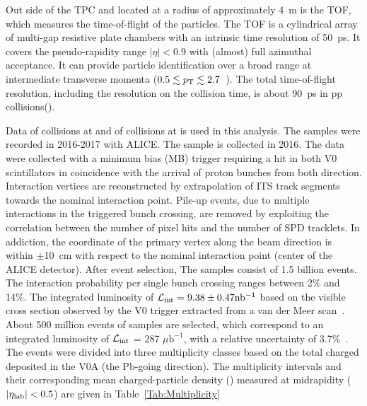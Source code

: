 Out side of the TPC and located at a radius of approximately 4~m is the TOF, which measures the time-of-flight of the particles. The TOF is a cylindrical array of multi-gap resistive plate chambers with an intrinsic time resolution of 50~ps. It covers the pseudo-rapidity range $|\eta| < 0.9$ with (almost) full azimuthal acceptance. It can provide particle identification over a broad range at intermediate transverse momenta ($0.5 \lesssim p_{\rm T} \lesssim 2.7$~\GeVc). The total time-of-flight resolution, including the resolution on the collision time, is about 90~ps in pp collisions().

Data of \pp collisions at \thirteen and of \pPb collisions at \fivenn is used in this analysis. The \pp samples were recorded in 2016-2017 with ALICE.  The \pPb sample is collected in 2016. The data were collected with a minimum bias (MB) trigger requiring a hit in both V0 scintillators in coincidence with the arrival of proton bunches from both direction. Interaction vertices are reconstructed by extrapolation of ITS track segments towards the nominal interaction point. Pile-up events, due to multiple interactions in the triggered bunch crossing, are removed by exploiting the correlation between the number of pixel hits and the number of SPD tracklets. In addiction, the coordinate of the primary vertex along the beam direction is within $\pm$10~cm with respect to the nominal interaction point (center of the ALICE detector). After event selection, The \pp samples consist of 1.5 billion events.  The interaction probability per single bunch crossing ranges between 2\% and 14\%. The integrated luminosity of $\mathcal{L}_\mathrm{int} = 9.38 \pm 0.47 \mathrm{nb^{-1}}$ based on the visible cross section observed by the V0 trigger extracted from a van der Meer scan~\cite{ALICE-PUBLIC-2016-002}. About 500 million events of \pPb samples are selected, which correspond to an integrated luminosity of $\mathcal{L}_\mathrm{int}$ = 287 $\mu\mathrm{b}^{-1}$, with a relative uncertainty of 3.7\%~\cite{collaboration_2014}. The \pPb events were divided into three multiplicity classes based on the total charged deposited in the V0A (the Pb-going direction). The multiplicity intervals and their corresponding mean charged-particle density (\dndetalab) measured at midrapidity ($|\eta_{\rm lab}| < 0.5$) are given in Table~\ref{Tab:Multiplicity}


